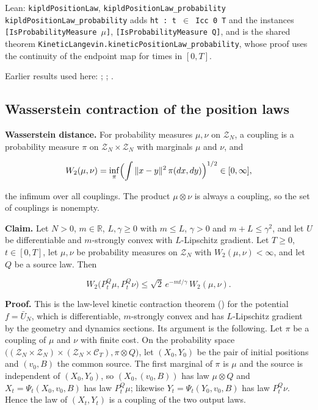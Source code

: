 \documentclass[11pt,a4paper]{report}
\begin{document}
\begin{leanbox}{Lean: \texttt{kipldPositionLaw}, \texttt{kipldPositionLaw\_\allowbreak{}probability}}
\texttt{kipld\allowbreak{}Position\allowbreak{}Law\_\allowbreak{}probability} adds \texttt{ht : t \ensuremath{\in} Icc 0 T} and the instances \texttt{[Is\allowbreak{}Probability\allowbreak{}Measure \ensuremath{\mu}]}, \texttt{[Is\allowbreak{}Probability\allowbreak{}Measure Q]}, and is the shared theorem \texttt{Kinetic\allowbreak{}Langevin.\allowbreak{}kinetic\allowbreak{}Position\allowbreak{}Law\_\allowbreak{}probability}, whose proof uses the continuity of the endpoint map for times in \([0,T]\).
\end{leanbox}


Earlier results used here: \cite[Section~3.1.1]{LangevinLean2026IPLA}; \cite[Section~3.2.2]{LangevinLean2026Kinetic}; \cite[Section~3.9.6]{LangevinLean2026Kinetic}.
\subsection{\texorpdfstring{Wasserstein contraction of the position laws}{Wasserstein contraction of the position laws}}
\label{report-step-KIPLMC-FlowLaw-lean-3}


\textbf{Wasserstein distance.} For probability measures \(\mu,\nu\) on \(\mathcal Z_N\), a coupling is a probability measure \(\pi\) on \(\mathcal Z_N\times\mathcal Z_N\) with marginals \(\mu\) and \(\nu\), and


\[W_2(\mu,\nu)=\inf_\pi\Bigl(\int\|x-y\|^2\,\pi(dx,dy)\Bigr)^{1/2}\in[0,\infty],\]


the infimum over all couplings. The product \(\mu\otimes\nu\) is always a coupling, so the set of couplings is nonempty.




\textbf{Claim.} Let \(N>0\), \(m\in\mathbb R\), \(L,\gamma\ge0\) with \(m\le L\), \(\gamma>0\) and \(m+L\le\gamma^2\), and let \(U\) be differentiable and \(m\)-strongly convex with \(L\)-Lipschitz gradient. Let \(T\ge0\), \(t\in[0,T]\), let \(\mu,\nu\) be probability measures on \(\mathcal Z_N\) with \(W_2(\mu,\nu)<\infty\), and let \(Q\) be a source law. Then


\[W_2\bigl(P^Q_t\mu,P^Q_t\nu\bigr)\le\sqrt2\,e^{-mt/\gamma}\,W_2(\mu,\nu).\]


\textbf{Proof.} This is the law-level kinetic contraction theorem (\cite[Section~3.9.6]{LangevinLean2026Kinetic}) for the potential \(f=\bar U_N\), which is differentiable, \(m\)-strongly convex and has \(L\)-Lipschitz gradient by the geometry and dynamics sections. Its argument is the following. Let \(\pi\) be a coupling of \(\mu\) and \(\nu\) with finite cost. On the probability space \(\bigl((\mathcal Z_N\times\mathcal Z_N)\times(\mathcal Z_N\times\mathcal C_T),\pi\otimes Q\bigr)\), let \((X_0,Y_0)\) be the pair of initial positions and \((v_0,B)\) the common source. The first marginal of \(\pi\) is \(\mu\) and the source is independent of \((X_0,Y_0)\), so \((X_0,(v_0,B))\) has law \(\mu\otimes Q\) and \(X_t=\Psi_t(X_0,v_0,B)\) has law \(P^Q_t\mu\); likewise \(Y_t=\Psi_t(Y_0,v_0,B)\) has law \(P^Q_t\nu\). Hence the law of \((X_t,Y_t)\) is a coupling of the two output laws.
\end{document}
